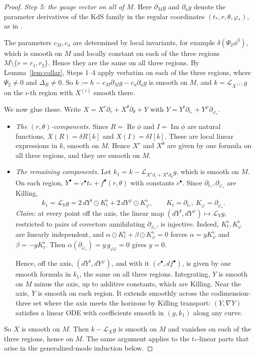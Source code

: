 \documentclass[11pt]{amsart}
\theoremstyle{definition}
\theoremstyle{remark}
\numberwithin{equation}{section}
\newcommand{\cL}{\mathcal{L}}
\renewcommand{\Im}{\operatorname{Im}}
\renewcommand{\Re}{\operatorname{Re}}
\begin{document}
\begin{proof}
\emph{Step 5: the gauge vector on all of $M$.} Here $\partial_Mg$ and $\partial_ag$ denote the parameter derivatives
of the KdS family in the regular coordinates $(t_*,r,\theta,\varphi_*)$, as in \cite{HPV25}.

The parameters $c_M,c_a$ are determined by local invariants, for example $\delta(\Psi_2\phi^3)$, which is smooth on $M$
and locally constant on each of the three regions $M\setminus\{r=r_1,r_2\}$. Hence they are the same on all three
regions. By Lemma~\ref{lem:collar}, Steps 1--4 apply verbatim on each of the three regions, where
$\Psi_2\ne0$ and $\Delta_R\ne0$. So $k:=h-c_M\partial_Mg-c_a\partial_ag$ is smooth on $M$, and $k=\cL_{X^{(i)}}g$ on
the $i$-th region with $X^{(i)}$ smooth there.

We now glue these. Write $X=X^r\partial_r+X^\theta\partial_\theta+Y$ with $Y=Y^t\partial_{t_*}+Y^\varphi\partial_{\varphi_*}$.
\begin{itemize}
\item \emph{The $(r,\theta)$-components.} Since $R=\Re\phi$ and $I=\Im\phi$ are natural functions,
$X(R)=\delta R[k]$ and $X(I)=\delta I[k]$. These are local linear expressions in $k$, smooth on $M$. Hence
$X^r$ and $X^\theta$ are given by one formula on all three regions, and they are smooth on $M$.
\item \emph{The remaining components.} Let $k_1=k-\cL_{X^r\partial_r+X^\theta\partial_\theta}g$, which is smooth on $M$. On
each region, $Y^\bullet=c^\bullet t_*+f^\bullet(r,\theta)$ with constants $c^\bullet$. Since $\partial_{t_*},\partial_{\varphi_*}$ are
Killing,
\[
k_1=\cL_Yg=2\,dY^t\odot K_t^\flat+2\,dY^\varphi\odot K_\varphi^\flat,\qquad K_t=\partial_{t_*},\ K_\varphi=\partial_{\varphi_*}.
\]
\emph{Claim:} at every point off the axis, the linear map $(dY^t,dY^\varphi)\mapsto\cL_Yg$, restricted to pairs of
covectors annihilating $\partial_{\varphi_*}$, is injective. Indeed, $K_t^\flat,K_\varphi^\flat$ are linearly independent, and
$\alpha\odot K_t^\flat+\beta\odot K_\varphi^\flat=0$ forces $\alpha=yK_\varphi^\flat$ and $\beta=-yK_t^\flat$. Then
$\alpha(\partial_{\varphi_*})=y\,g_{\varphi\varphi}=0$ gives $y=0$.

Hence, off the axis, $(dY^t,dY^\varphi)$, and with it $(c^\bullet,df^\bullet)$, is given by one smooth formula in $k_1$, the same on
all three regions. Integrating, $Y$ is smooth on $M$ minus the axis, up to additive constants, which are Killing. Near the
axis, $Y$ is smooth on each region. It extends smoothly across the codimension-three set where the axis meets the
horizons by Killing transport: $(Y,\nabla Y)$ satisfies a linear ODE with coefficients smooth in $(g,k_1)$ along
any curve.
\end{itemize}
So $X$ is smooth on $M$. Then $k-\cL_Xg$ is smooth on $M$ and vanishes on each of the three regions, hence on $M$.
The same argument applies to the $t_*$-linear parts that arise in the generalized-mode induction below.
\end{proof}
\end{document}
